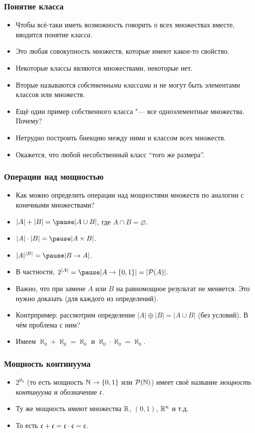 \documentclass[10pt]{beamer}
\begin{document}
\begin{frame}
    \frametitle{Понятие класса}
    \begin{itemize}
        \item Чтобы всё-таки иметь возможность говорить о всех множествах вместе, вводится понятие \emph{класса}.
        \item Это любая совокупность множеств, которые имеют какое-то свойство.
        \item Некоторые классы являются множествами, некоторые нет. 
        \item Вторые называются \emph{собственными классами} и не могут быть элементами классов или множеств.
        \item Ещё один пример собственного класса "--- все одноэлементные множества. Почему?
        \pause
        \item Нетрудно построить биекцию между ними и классом всех множеств.
        \pause
        \item Окажется, что любой несобственный класс \enquote{того же размера}.
    \end{itemize}
\end{frame}

\begin{frame}
    \frametitle{Операции над мощностью}
    \begin{itemize}
        \item Как можно определить операции над мощностями множеств по аналогии с конечными множествами?
        \item $|A| + |B| = \pause |A \cup B|$, где $A \cap B = \varnothing$. \pause
        \item $|A| \cdot |B| = \pause |A \times B|$. \pause
        \item $|A|^{|B|} = \pause |B \to A|$.
        \item В частности, $2^{|A|} = \pause |A \to \{0,1\}| = |\pow{A}|$. \pause
        \pause
        \item Важно, что при замене $A$ или $B$ на равномощное результат не меняется. Это нужно доказать (для каждого из определений).
        \item Контрпример: рассмотрим определение $|A| \oplus |B| = |A \cup B|$ (без условий). В чём проблема с ним?
        \item Имеем $\aleph_0 + \aleph_0 = \aleph_0$ и $\aleph_0 \cdot \aleph_0 = \aleph_0$.
    \end{itemize}
\end{frame}

\begin{frame}
    \frametitle{Мощность континуума}
    \begin{itemize}
        \item $2^{\aleph_0}$ (то есть мощность $\mathbb{N} \to \{0,1\}$ или $\mathcal{P}({\mathbb{N}})$) имеет своё название \emph{мощность континуума} и обозначение $\mathfrak{c}$.
        \item Ту же мощность имеют множества $\mathbb{R}$, $(0, 1)$, $\mathbb{R}^n$ и т.д.
        \item То есть $\mathfrak{c} + \mathfrak{c} = \mathfrak{c} \cdot \mathfrak{c} = \mathfrak{c}$.
    \end{itemize}
\end{frame}
\end{document}
